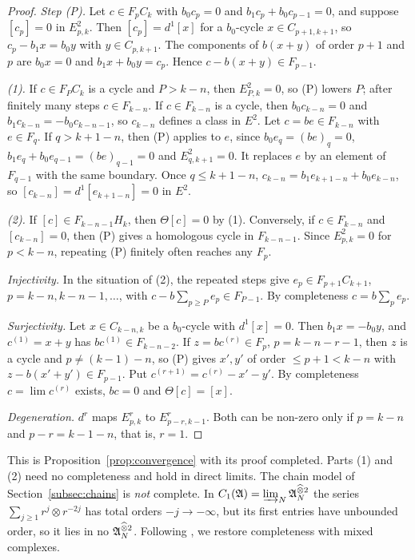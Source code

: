 \begin{proof}
\emph{Step (P).} Let \(c\in F_pC_k\) with \(b_0c_p=0\) and \(b_1c_p+b_0
c_{p-1}=0\), and suppose \([c_p]=0\) in \(E^2_{p,k}\). Then \([c_p]=d^1[x]\)
for a \(b_0\)-cycle \(x\in C_{p+1,k+1}\), so \(c_p-b_1x=b_0y\) with
\(y\in C_{p,k+1}\). The components of \(b(x+y)\) of order \(p+1\) and \(p\)
are \(b_0x=0\) and \(b_1x+b_0y=c_p\). Hence \(c-b(x+y)\in F_{p-1}\).

\emph{(1).} If \(c\in F_PC_k\) is a cycle and \(P>k-n\), then
\(E^2_{P,k}=0\), so (P) lowers \(P\); after finitely many steps \(c\in
F_{k-n}\). If \(c\in F_{k-n}\) is a cycle, then \(b_0c_{k-n}=0\) and
\(b_1c_{k-n}=-b_0c_{k-n-1}\), so \(c_{k-n}\) defines a class in \(E^2\). Let
\(c=be\in F_{k-n}\) with \(e\in F_q\). If \(q>k+1-n\), then (P) applies
to \(e\), since \(b_0e_q=(be)_q=0\), \(b_1e_q+b_0e_{q-1}=(be)_{q-1}=0\) and
\(E^2_{q,k+1}=0\). It replaces \(e\) by an element of \(F_{q-1}\) with the
same boundary. Once \(q\le k+1-n\), \(c_{k-n}=b_1e_{k+1-n}+b_0e_{k-n}\), so
\([c_{k-n}]=d^1[e_{k+1-n}]=0\) in \(E^2\).

\emph{(2).} If \([c]\in F_{k-n-1}H_k\), then \(\Theta[c]=0\) by (1).
Conversely, if \(c\in F_{k-n}\) and \([c_{k-n}]=0\), then (P) gives a
homologous cycle in \(F_{k-n-1}\). Since \(E^2_{p,k}=0\) for \(p<k-n\),
repeating (P) finitely often reaches any \(F_p\).

\emph{Injectivity.} In the situation of (2), the repeated steps give
\(e_p\in F_{p+1}C_{k+1}\), \(p=k-n,k-n-1,\dots\), with \(c-b\sum_{p\ge
P}e_p\in F_{P-1}\). By completeness \(c=b\sum_pe_p\).

\emph{Surjectivity.} Let \(x\in C_{k-n,k}\) be a \(b_0\)-cycle with
\(d^1[x]=0\). Then \(b_1x=-b_0y\), and \(c^{(1)}=x+y\) has \(bc^{(1)}\in
F_{k-n-2}\). If \(z=bc^{(r)}\in F_p\), \(p=k-n-r-1\), then \(z\) is a cycle
and \(p\ne(k-1)-n\), so (P) gives \(x',y'\) of order \(\le p+1<k-n\) with
\(z-b(x'+y')\in F_{p-1}\). Put \(c^{(r+1)}=c^{(r)}-x'-y'\). By completeness
\(c=\lim c^{(r)}\) exists, \(bc=0\) and \(\Theta[c]=[x]\).

\emph{Degeneration.} \(d^r\) maps \(E^r_{p,k}\) to \(E^r_{p-r,k-1}\). Both
can be non-zero only if \(p=k-n\) and \(p-r=k-1-n\), that is, \(r=1\).
\end{proof}

This is Proposition~\ref{prop:convergence} with its proof completed.
Parts (1) and (2) need no completeness and hold in direct limits. The
chain model of Section~\ref{subsec:chains} is \emph{not} complete. In
\(C_1(\mathfrak A)=\varinjlim_N\mathfrak A_N^{\mathbin{\widehat\otimes}2}\) the series
\(\sum_{j\ge1}r^j\otimes r^{-2j}\) has total orders \(-j\to-\infty\), but
its first entries have unbounded order, so it lies in no
\(\mathfrak A_N^{\mathbin{\widehat\otimes}2}\). Following \cite[\S``Convergence and
degeneration'']{HHb}, we restore completeness with mixed complexes.

